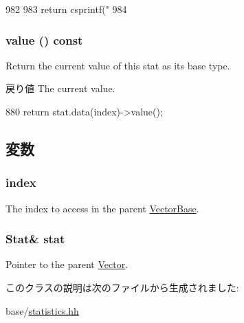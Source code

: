 \begin{DoxyCode}
982     {
983         return csprintf("%
984     }
\end{DoxyCode}
\hypertarget{classStats_1_1ScalarProxy_aa9e486cb7eb0ad44f5f89923594b68a4}{
\subsubsection[{value}]{ value () const}}
\label{classStats_1_1ScalarProxy_aa9e486cb7eb0ad44f5f89923594b68a4}
Return the current value of this stat as its base type. \begin{DoxyReturn}{戻り値}
The current value. 
\end{DoxyReturn}



\begin{DoxyCode}
880 { return stat.data(index)->value(); }
\end{DoxyCode}


\subsection{変数}
\hypertarget{classStats_1_1ScalarProxy_a9707c4a1627041aeffc05da26c91acff}{
\subsubsection[{index}]{ {\bf index}}}
\label{classStats_1_1ScalarProxy_a9707c4a1627041aeffc05da26c91acff}
The index to access in the parent \hyperlink{classStats_1_1VectorBase}{VectorBase}. \hypertarget{classStats_1_1ScalarProxy_a7fee3822515c4dc6b8b99a8bf35fa6b8}{
\subsubsection[{stat}]{\setlength{\rightskip}{0pt plus 5cm}Stat\& {\bf stat}}}
\label{classStats_1_1ScalarProxy_a7fee3822515c4dc6b8b99a8bf35fa6b8}
Pointer to the parent \hyperlink{classStats_1_1Vector}{Vector}. 

このクラスの説明は次のファイルから生成されました:\begin{DoxyCompactItemize}
\item 
base/\hyperlink{statistics_8hh}{statistics.hh}\end{DoxyCompactItemize}
